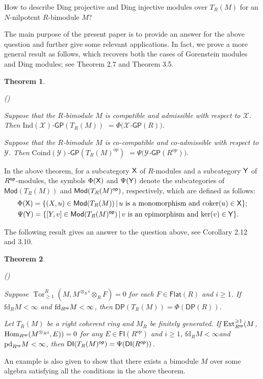 \documentclass[10pt,twoside]{amsart}
\newtheorem{intthm}{Theorem}[]
\theoremstyle{bfupright head,slanted body}
\theoremstyle{bfupright head,upright body}
\theoremstyle{fixed bf head,slanted body}
\theoremstyle{fixed bf head,upright body}
\theoremstyle{numbered paragraph}
\newlength{\thmlistleft}        %
\newlength{\thmlistright}       %
\newlength{\thmlistpartopsep}   %
\newlength{\thmlisttopsep}      %
\newlength{\thmlistparsep}      %
\newlength{\thmlistitemsep}     %
\newcounter{rqm}
\newenvironment{rqm}{\begin{list}{\upshape (\arabic{rqm})}%
    {\usecounter{rqm}%
      \setlength{\leftmargin}{\thmlistleft}%
      \setlength{\labelwidth}{\thmlistleft}%
      \setlength{\rightmargin}{\thmlistright}%
      \setlength{\partopsep}{\thmlistpartopsep}%
      \setlength{\topsep}{\thmlisttopsep}%
      \setlength{\parsep}{\thmlistparsep}%
      \setlength{\itemsep}{\thmlistitemsep}}}%
  {\end{list}}%
\numberwithin{equation}{res}
\newcommand{\GP}{\mathsf{GP}}
\newcommand{\DP}{\mathsf{DP}}
\newcommand{\DI}{\mathsf{DI}}
\newcommand{\fd}{\mathrm{fd}}
\newcommand{\pd}{\mathrm{pd}}
\newcommand{\Flat}{\mathsf{Flat}}
\newcommand{\FI}{\mathsf{FI}}
\newcommand{\Mod}{\mathsf{Mod}}
\newcommand{\Coind}{\mathrm{Coind}}
\newcommand{\Ind}{\mathrm{Ind}}
\newcommand{\Rop}{R^{\sf op}}
\newcommand{\op}{\sf op}
\newcommand{\cok}{\mbox{\rm coker}}
\newcommand{\kernel}{\mbox{\rm ker}}
\newcommand{\Hom}{\operatorname{Hom}}
\newcommand{\Ext}{\operatorname{Ext}}
\newcommand{\Tor}{\operatorname{Tor}}
\begin{document}
\begin{que*} 
How to describe Ding projective and Ding injective modules over $T_R(M)$ for an $N$-nilpotent $R$-bimodule $M$?
\end{que*}

The main purpose of the present paper is to provide an answer for the above question and
further give some relevant applications.
In fact, we prove a more general result as follows, which recovers both the cases of Gorenstein modules and Ding modules; see Theorem 2.7 and Theorem 3.5.

\begin{intthm} \label{THM GP}

\begin{rqm}
\item Suppose that the $R$-bimodule $M$ is compatible and admissible with respect to $\mathcal{X}$.
Then 
$\Ind(\mathcal{X})$-$\GP(T_R(M))$ $= \Phi(\mathcal{X}$-$\GP(R))$.
\item Suppose that the $R$-bimodule $M$ is co-compatible and co-admissible with respect to $\mathcal{Y}$.
Then 
$\Coind(\mathcal{Y})$-$\GP(T_R(M)^{op})$ $= \Psi(\mathcal{Y}$-$\GP(R^{op}))$.
\end{rqm}
\end{intthm}

In the above theorem, for a subcategory $\sf{X}$ of $R$-modules
and a subcategory $\sf{Y}$ of $R^{\op}$-modules,
the symbols $\Phi(\sf{X})$ and $\Psi(\sf{Y})$
denote the subcategories of $\Mod(T_R(M))$ and $\Mod(T_R(M)^{\op})$, respectively,
which are defined as follows:
\begin{align*}
&\Phi({\sf{X}}) = \{(X,u) \in \Mod(T_R(M)) \,|\,
u \textrm{ is a monomorphism and } \cok(u) \in \sf{X}\}; \\
&\Psi({\sf{Y}}) = \{[Y,v] \in \Mod(T_R(M)^{\op}) \,|\,
v \textrm{ is an epimorphism and } \kernel(v) \in \sf{Y}\}.
\end{align*}

The following result gives an answer to the question above, see Corollary 2.12 and 3.10.

\begin{intthm} \label{}
\begin{rqm}
\item Suppose $\Tor_{\geqslant 1}^R(M, M^{\otimes_Ri}\otimes_R F)=0$
for each $F\in \Flat(R)$ and $i \geqslant 1$.
If $\fd_RM<\infty$ and $\fd_{\Rop}M<\infty$,
then $\DP(T_R(M)) = \Phi(\DP(R))$.
\item Let $T_R(M)$ be a right coherent ring and $M_{R}$ be finitely generated.
If $\Ext_{\Rop}^{\geqslant 1}(M$, $\Hom_{\Rop}(M^{\otimes_Ri}, E))=0$ for any $E\in\FI(R^{op})$ and $i\geqslant 1$,
$\fd_{R}M<\infty$and $\pd_{\Rop}M<\infty$,
then $\DI(T_R(M)^{\op}) = \Psi(\DI(\Rop))$.
\end{rqm}
\end{intthm}
An example is also given to show that there exists a bimodule $M$ over some algebra satisfying
all the conditions in the above theorem.
\end{document}
